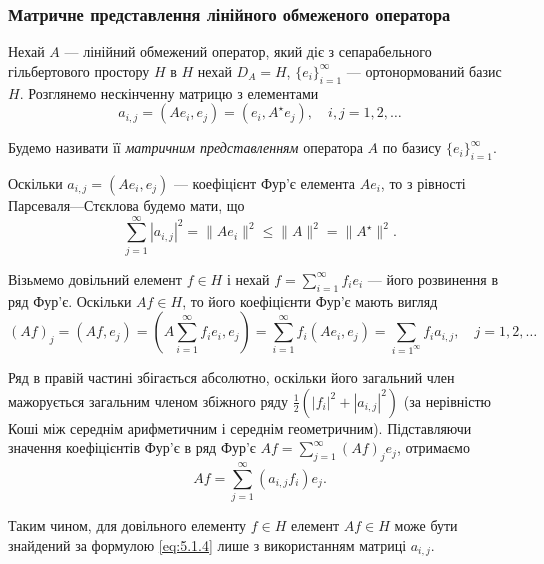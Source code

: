 \subsubsection{Матричне представлення лінійного обмеженого оператора}

Нехай $A$ --- лінійний обмежений оператор, який діє з сепарабельного гільбертового простору $H$ в $H$ нехай $D_A = H$, $\{e_i\}_{i = 1}^\infty$ --- ортонормований базис $H$. Розглянемо нескінченну матрицю з елементами
\begin{equation}
    \label{eq:5.1.1}
    a_{i,j} = (A e_i, e_j) = (e_i, A^\star e_j), \quad i, j = 1, 2, \ldots
\end{equation}

\begin{definition}
    Будемо називати її \emph{матричним представленням} оператора $A$ по базису $\{e_i\}_{i = 1}^\infty$.
\end{definition}

Оскільки $a_{i,j} = (A e_i, e_j)$ --- коефіцієнт Фур'є елемента $A e_i$, то з рівності Парсеваля---Стєклова будемо мати, що
\begin{equation}
    \label{eq:5.1.2}
    \sum_{j = 1}^\infty |a_{i, j}|^2 = \|A e_i\|^2 \le \|A\|^2 = \|A^\star\|^2.
\end{equation}

Візьмемо довільний елемент $f \in H$ і нехай $f = \sum_{i = 1}^\infty f_i e_i$ --- його розвинення в ряд Фур'є. Оскільки $A f \in H$, то його коефіцієнти Фур'є мають вигляд
\begin{equation}
    \label{eq:5.1.3}
    (A f)_j = (Af, e_j) = \left( A \sum_{i = 1}^\infty f_i e_i, e_j \right) = \sum_{i = 1}^\infty f_i (A e_i, e_j) = \sum_{i = 1^\infty} f_i a_{i,j}, \quad j = 1, 2, \ldots
\end{equation}

Ряд в правій частині збігається абсолютно, оскільки його загальний член мажорується загальним членом збіжного ряду $\frac{1}{2} (|f_i|^2 + |a_{i,j}|^2)$ (за нерівністю Коші між середнім арифметичним і середнім геометричним). Підставляючи
значення коефіцієнтів Фур'є в ряд Фур'є $A f = \sum_{j = 1}^\infty (A f)_j e_j$, отримаємо
\begin{equation}
    \label{eq:5.1.4}
    A f = \sum_{j = 1}^\infty \left( a_{i,j} f_i \right) e_j.
\end{equation}

Таким чином, для довільного елементу $f \in H$ елемент $A f \in H$ може бути знайдений за формулою \eqref{eq:5.1.4} лише з використанням матриці $a_{i, j}$.

